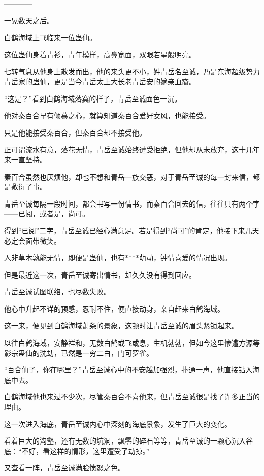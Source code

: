 
\begin{this_body}

------------

一晃数天之后。

白鹤海域上飞临来一位蛊仙。

这位蛊仙身着青衫，青年模样，高鼻宽面，双眼若星般明亮。

七转气息从他身上散发而出，他的来头更不小，姓青岳名至诚，乃是东海超级势力青岳家的蛊仙，更是当今青岳太上大长老青岳安的嫡亲血裔。

“这是？”看到白鹤海域落寞的样子，青岳至诚面色一沉。

他对秦百合早有倾慕之心，就算知道秦百合爱好女风，也能接受。

只是他能接受秦百合，但秦百合却不接受他。

正可谓流水有意，落花无情，青岳至诚始终遭受拒绝，但他却从未放弃，这十几年来一直坚持。

秦百合虽然也厌烦他，却也不想和青岳一族交恶，对于青岳至诚的每一封来信，都是敷衍了事。

青岳至诚每隔一段时间，都会书写一份情书，而秦百合回去的信，往往只有两个字——已阅，或者是，尚可。

得到“已阅”二字，青岳至诚已经心满意足。若是得到“尚可”的肯定，他接下来几天必定会面带微笑。

人非草木孰能无情，即便是蛊仙，也有****萌动，钟情喜爱的情况出现。

但是最近这一次，青岳至诚寄出情书，却久久没有得到回应。

青岳至诚试图联络，也尽数失败。

他心中升起不详的预感，忍耐不住，便直接动身，亲自赶来白鹤海域。

这一来，便见到白鹤海域萧条的景象，这顿时让青岳至诚的眉头紧锁起来。

以往白鹤海域，安静祥和，无数白鹤或飞或息，生机勃勃，但如今这里惨遭方源等影宗蛊仙的洗劫，已然是一穷二白，门可罗雀。

“百合仙子，你在哪里？”青岳至诚心中的不安越加强烈，扑通一声，他直接钻入海底中去。

白鹤海域他也来过不少次，尽管秦百合不喜他来，但青岳至诚很是找了许多正当的理由。

这一次进入海底，青岳至诚内心中深刻的海底景象，发生了巨大的变化。

看着巨大的沟壑，还有无数的坑洞，飘零的碎石等等，青岳至诚的一颗心沉入谷底：“不好，看这样的情形，这里遭受了劫掠。”

又查看一阵，青岳至诚满脸愤怒之色。


\end{this_body}
